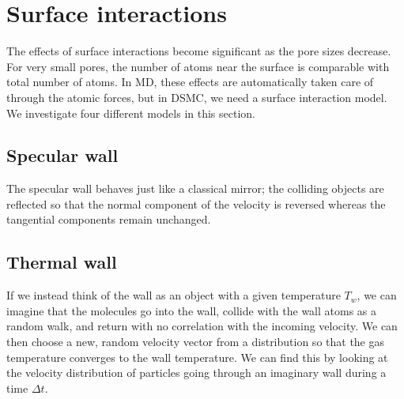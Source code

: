 \section{Surface interactions}
The effects of surface interactions become significant as the pore sizes decrease. For very small pores, the number of atoms near the surface is comparable with total number of atoms. In MD, these effects are automatically taken care of through the atomic forces, but in DSMC, we need a surface interaction model. We investigate four different models in this section.
\subsection{Specular wall}
The specular wall behaves just like a classical mirror; the colliding objects are reflected so that the normal component of the velocity is reversed whereas the tangential components remain unchanged. 

\subsection{Thermal wall}
If we instead think of the wall as an object with a given temperature $T_w$, we can imagine that the molecules go into the wall, collide with the wall atoms as a random walk, and return with no correlation with the incoming velocity. We can then choose a new, random velocity vector from a distribution so that the gas temperature converges to the wall temperature. We can find this by looking at the velocity distribution of particles going through an imaginary wall during a time $\Delta t$.
